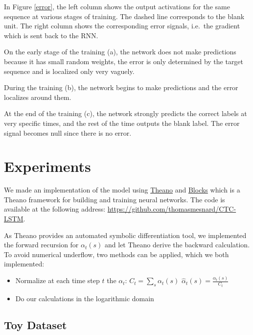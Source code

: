 \documentclass[11pt,a4paper]{article}
\begin{document}
In Figure \ref{error}, the left column shows the output activations for the same sequence at various stages of training. The dashed line corresponds to the blank unit. The right column shows the corresponding error signals, i.e.~the gradient which is sent back to the RNN.

On the early stage of the training (a), the network does not make predictions because it has small random weights, the error is only determined by the target sequence and is localized only very vaguely.

During the training (b), the network begins to make predictions and the error localizes around them.

At the end of the training (c), the network strongly predicts the correct labels at very specific times, and the rest of the time outputs the blank label. The error signal becomes null since there is no error.


\section{Experiments}

We made an implementation of the model using \href{https://github.com/Theano/Theano}{Theano} and \href{https://github.com/mila-udem/blocks/}{Blocks} which is a Theano framework for building and training neural networks. The code is available at the following address: \url{https://github.com/thomasmesnard/CTC-LSTM}.

As Theano provides an automated symbolic differentiation tool, we implemented the forward recursion for $\alpha_t(s)$ and let Theano derive the backward calculation. To avoid numerical underflow, two methods can be applied, which we both implemented:

\begin{itemize}
    \item Normalize at each time step $t$ the $\alpha_t$:
    \hspace{1em}
    $ C_t = \sum_s \alpha_t(s)$
    \hspace{1em}
    $\hat{\alpha}_t(s) = \frac{\alpha_t(s)}{C_t}$
    \item Do our calculations in the logarithmic domain

\end{itemize}

\subsection{Toy Dataset}
\end{document}
